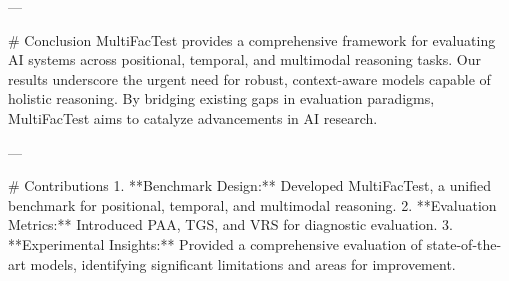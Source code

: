 ---

# Conclusion  
MultiFacTest provides a comprehensive framework for evaluating AI systems across positional, temporal, and multimodal reasoning tasks. Our results underscore the urgent need for robust, context-aware models capable of holistic reasoning. By bridging existing gaps in evaluation paradigms, MultiFacTest aims to catalyze advancements in AI research.

---

# Contributions  
1. **Benchmark Design:** Developed MultiFacTest, a unified benchmark for positional, temporal, and multimodal reasoning.
2. **Evaluation Metrics:** Introduced PAA, TGS, and VRS for diagnostic evaluation.
3. **Experimental Insights:** Provided a comprehensive evaluation of state-of-the-art models, identifying significant limitations and areas for improvement.